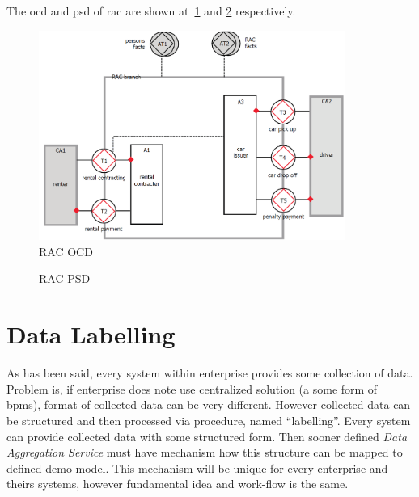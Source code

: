 The \gls{ocd} and \gls{psd} of \gls{rac} are shown at~\cref{fig:rac-ocd} and \cref{fig:rac-psd} respectively.
\begin{figure}[ht!]
\centering
\includegraphics[width=10cm,keepaspectratio]{img/rac-ocd}
\caption{RAC OCD}
\label{fig:rac-ocd}
\end{figure}

\begin{figure}[ht!]
 \centering
 \qquad
 \caption{RAC PSD}%
 \label{fig:rac-psd}%
\end{figure}
\newpage
\section{Data Labelling}
As has been said, every system within enterprise provides some collection of data. Problem is, if enterprise does note use centralized solution (a some form of \gls{bpms}), format of collected data can be very different. 
However collected data can be structured and then processed via procedure, named ``labelling''. Every system can provide collected data with some structured form. Then sooner defined \textit{Data Aggregation Service} must have mechanism how this structure can be mapped to defined \gls{demo} model. This mechanism will be unique for every enterprise and theirs systems, however fundamental idea and work-flow is the same.

